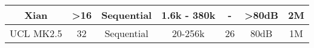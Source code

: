 \begin{table}[]
\begin{tabular}{|c|c|c|c|c|c|c|}
Xian                                                           & \textgreater16      & Sequential                                                            & 1.6k - 380k                                                         & -                                                                    & \textgreater80dB   & 2M                                                                                  \\ \hline
UCL MK2.5                                                      & 32                  & Sequential                                                            & 20-256k                                                             & 26                                                                   & 80dB               & 1M                                                                                  \\ \hline
\end{tabular}
\end{table}